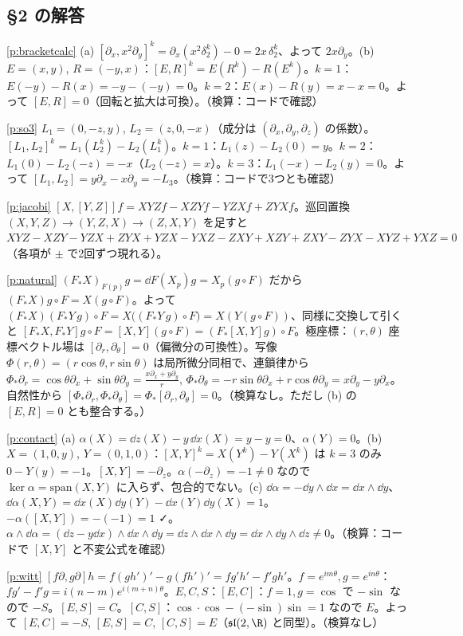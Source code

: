 \subsection*{§2 の解答}
\begin{sol}{\ref{p:bracketcalc}}
(a) $[\partial_x,x^2\partial_y]^k=\partial_x(x^2\delta^k_2)-0=2x\,\delta^k_2$、よって $2x\partial_y$。(b) $E=(x,y)$, $R=(-y,x)$：$[E,R]^k=E(R^k)-R(E^k)$。$k=1$：$E(-y)-R(x)=-y-(-y)=0$。$k=2$：$E(x)-R(y)=x-x=0$。よって $[E,R]=0$（回転と拡大は可換）。（検算：コードで確認）
\end{sol}
\begin{sol}{\ref{p:so3}}
$L_1=(0,-z,y)$, $L_2=(z,0,-x)$（成分は $(\partial_x,\partial_y,\partial_z)$ の係数）。$[L_1,L_2]^k=L_1(L_2^k)-L_2(L_1^k)$。$k=1$：$L_1(z)-L_2(0)=y$。$k=2$：$L_1(0)-L_2(-z)=-x$（$L_2(-z)=x$）。$k=3$：$L_1(-x)-L_2(y)=0$。よって $[L_1,L_2]=y\partial_x-x\partial_y=-L_3$。（検算：コードで3つとも確認）
\end{sol}
\begin{sol}{\ref{p:jacobi}}
$[X,[Y,Z]]f=XYZf-XZYf-YZXf+ZYXf$。巡回置換 $(X,Y,Z)\to(Y,Z,X)\to(Z,X,Y)$ を足すと
$XYZ-XZY-YZX+ZYX+YZX-YXZ-ZXY+XZY+ZXY-ZYX-XYZ+YXZ=0$（各項が $\pm$ で2回ずつ現れる）。
\end{sol}
\begin{sol}{\ref{p:natural}}
$(F_*X)_{F(p)}g=\dd F(X_p)g=X_p(g\circ F)$ だから $(F_*X)g\circ F=X(g\circ F)$。よって $(F_*X)(F_*Y\,g)\circ F=X\bigl((F_*Y\,g)\circ F\bigr)=X(Y(g\circ F))$、同様に交換して引くと $[F_*X,F_*Y]g\circ F=[X,Y](g\circ F)=(F_*[X,Y]g)\circ F$。極座標：$(r,\theta)$ 座標ベクトル場は $[\partial_r,\partial_\theta]=0$（偏微分の可換性）。写像 $\Phi(r,\theta)=(r\cos\theta,r\sin\theta)$ は局所微分同相で、連鎖律から $\Phi_*\partial_r=\cos\theta\partial_x+\sin\theta\partial_y=\frac{x\partial_x+y\partial_y}r$, $\Phi_*\partial_\theta=-r\sin\theta\partial_x+r\cos\theta\partial_y=x\partial_y-y\partial_x$。自然性から $[\Phi_*\partial_r,\Phi_*\partial_\theta]=\Phi_*[\partial_r,\partial_\theta]=0$。（検算なし。ただし (b) の $[E,R]=0$ とも整合する。）
\end{sol}
\begin{sol}{\ref{p:contact}}
(a) $\alpha(X)=\dd z(X)-y\,\dd x(X)=y-y=0$、$\alpha(Y)=0$。(b) $X=(1,0,y)$, $Y=(0,1,0)$：$[X,Y]^k=X(Y^k)-Y(X^k)$ は $k=3$ のみ $0-Y(y)=-1$。$[X,Y]=-\partial_z$。$\alpha(-\partial_z)=-1\neq0$ なので $\ker\alpha=\mathrm{span}(X,Y)$ に入らず、包合的でない。(c) $\dd\alpha=-\dd y\wedge\dd x=\dd x\wedge\dd y$、$\dd\alpha(X,Y)=\dd x(X)\dd y(Y)-\dd x(Y)\dd y(X)=1$。$-\alpha([X,Y])=-(-1)=1$ ✓。$\alpha\wedge\dd\alpha=(\dd z-y\dd x)\wedge\dd x\wedge\dd y=\dd z\wedge\dd x\wedge\dd y=\dd x\wedge\dd y\wedge\dd z\ne0$。（検算：コードで $[X,Y]$ と不変公式を確認）
\end{sol}
\begin{sol}{\ref{p:witt}}
$[f\partial,g\partial]h=f(gh')'-g(fh')'=fg'h'-f'gh'$。$f=e^{im\theta},g=e^{in\theta}$：$fg'-f'g=i(n-m)e^{i(m+n)\theta}$。$E,C,S$：$[E,C]$：$f=1,g=\cos$ で $-\sin$ なので $-S$。$[E,S]=C$。$[C,S]$：$\cos\cdot\cos-(-\sin)\sin=1$ なので $E$。よって $[E,C]=-S$, $[E,S]=C$, $[C,S]=E$（$\mathfrak{sl}(2,\R)$ と同型）。（検算なし）
\end{sol}

